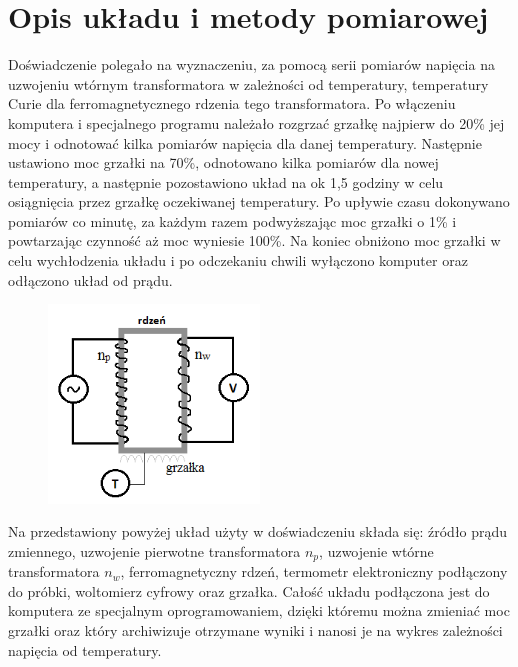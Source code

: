 \documentclass[a4paper,10pt]{article}
\begin{document}
\section{Opis układu i metody pomiarowej}
Doświadczenie polegało na wyznaczeniu, za pomocą serii pomiarów napięcia na uzwojeniu wtórnym transformatora w zależności od temperatury, temperatury Curie dla ferromagnetycznego rdzenia tego transformatora. Po włączeniu komputera i specjalnego programu należało rozgrzać grzałkę najpierw do 20\% jej mocy i odnotować kilka pomiarów napięcia dla danej temperatury. Następnie ustawiono moc grzałki na 70\%, odnotowano kilka pomiarów dla nowej temperatury, a następnie pozostawiono układ na ok 1,5 godziny w celu osiągnięcia przez grzałkę oczekiwanej temperatury. Po upływie czasu dokonywano pomiarów co minutę, za każdym razem podwyższając moc grzałki o 1\% i powtarzając czynność aż moc wyniesie 100\%. Na koniec obniżono moc grzałki w celu wychłodzenia układu i po odczekaniu chwili wyłączono komputer oraz odłączono układ od prądu.
\begin{figure}[H]
\center
\includegraphics[width=0.5\textwidth]{uklad.png}
\end{figure}
Na przedstawiony powyżej układ użyty w doświadczeniu składa się: źródło prądu zmiennego, uzwojenie pierwotne transformatora $n_p$, uzwojenie wtórne transformatora $n_w$, ferromagnetyczny rdzeń, termometr elektroniczny podłączony do próbki, woltomierz cyfrowy oraz grzałka. Całość układu podłączona jest do komputera ze specjalnym oprogramowaniem, dzięki któremu można zmieniać moc grzałki oraz który archiwizuje otrzymane wyniki i nanosi je na wykres zależności napięcia od temperatury.
\end{document}
